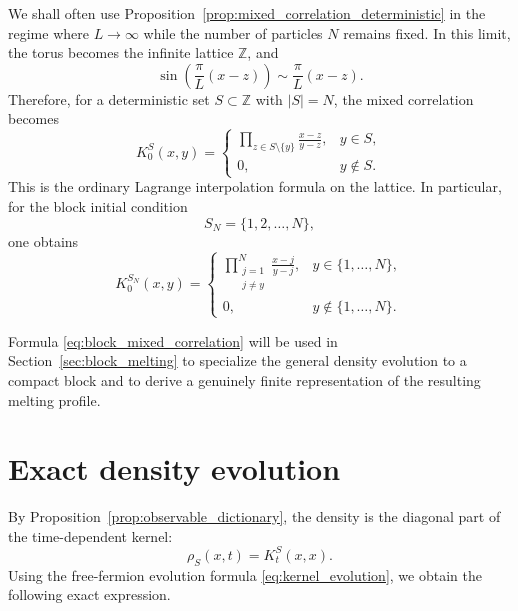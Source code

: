 \documentclass[11pt]{article}
\numberwithin{equation}{section}
\newcommand{\1}{\mathbf 1}
\begin{document}
We shall often use Proposition~\ref{prop:mixed_correlation_deterministic} in
the regime where \(L\to\infty\) while the number of particles \(N\) remains
fixed.  In this limit, the torus becomes the infinite lattice \(\mathbb Z\), and
\[
    \sin\left(\frac{\pi}{L}(x-z)\right)
    \sim
    \frac{\pi}{L}(x-z).
\]
Therefore, for a deterministic set \(S\subset\mathbb Z\) with \(|S|=N\), the
mixed correlation becomes
\begin{equation}
    K_0^S(x,y)
    =
    \begin{cases}
    \displaystyle
    \prod_{z\in S\setminus\{y\}}
    \frac{x-z}{y-z},
    & y\in S, \\[1.2em]
    0,
    & y\notin S .
    \end{cases}
    \label{eq:mixed_correlation_infinite}
\end{equation}
This is the ordinary Lagrange interpolation formula on the lattice.
In particular, for the block initial condition
\begin{equation}
    S_N=\{1,2,\ldots,N\},
    \label{eq:block_initial_condition}
\end{equation}
one obtains
\begin{equation}
    K_{0}^{S_N}(x,y)
    =
    \begin{cases}
    \displaystyle
    \prod_{\substack{j=1\\ j\neq y}}^N
    \frac{x-j}{y-j},
    & y\in\{1,\ldots,N\}, \\[1.2em]
    0,
    & y\notin\{1,\ldots,N\}.
    \end{cases}
    \label{eq:block_mixed_correlation}
\end{equation}

Formula \eqref{eq:block_mixed_correlation} will be used in
Section~\ref{sec:block_melting} to specialize the general density evolution
to a compact block and to derive a genuinely finite representation of the
resulting melting profile.

\section{Exact density evolution}
\label{sec:exact_density_evolution}
By Proposition~\ref{prop:observable_dictionary}, the density is the diagonal
part of the time-dependent kernel:
\[
    \rho_S(x,t)=K_t^S(x,x).
\]
Using the free-fermion evolution formula \eqref{eq:kernel_evolution}, we obtain
the following exact expression.
\end{document}
